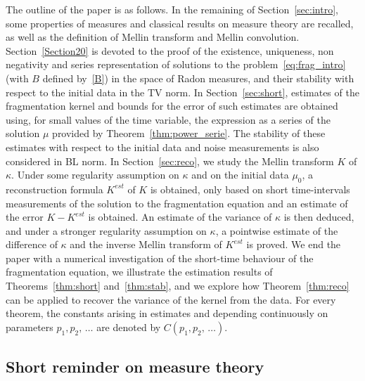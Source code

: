 \documentclass[AHL,Unicode,longabstracts,published]{cedram}
\begin{document}
The outline of the paper is as follows.
In the remaining of Section~\ref{sec:intro}, some properties of measures and classical results on measure theory are recalled, as well as the definition of Mellin transform and Mellin convolution. Section~\ref{Section20} is devoted to the proof of the existence, uniqueness, non negativity and series representation of solutions to the problem~\eqref{eq:frag_intro} (with $B$ defined by~\eqref{B}) in the space of Radon measures, and their stability with respect to the initial data in the TV norm. In Section~\ref{sec:short}, estimates of the fragmentation kernel and bounds for the error of such estimates are obtained using, for small values of the time variable, the expression as a series of the solution $\mu$ provided by Theorem~\ref{thm:power_serie}. The stability of these estimates with respect to the initial data and noise measurements is also considered in BL norm. In Section~\ref{sec:reco}, we study the Mellin transform $K$ of $\kappa $. Under some regularity assumption on $\kappa $ and on the initial data $\mu _0$, a reconstruction formula $K^{est}$ of $K$ is obtained, only based on short time-intervals measurements of the solution to the fragmentation equation and an estimate of the error $K-K^{est}$ is obtained. An estimate of the variance of $\kappa $ is then deduced, and under a stronger regularity assumption on $\kappa $, a pointwise estimate of the difference of $\kappa$ and the inverse Mellin transform of $K^{est}$ is proved. We end the paper with a numerical investigation of the short-time behaviour of the fragmentation equation, we illustrate the estimation results of Theorems~\ref{thm:short} and~\ref{thm:stab}, and we explore how Theorem~\ref{thm:reco} can be applied to recover the variance of the kernel from the data.
For every theorem, the constants arising in estimates and depending continuously on parameters $p_1,p_2,\, \dots$ are denoted by $C(p_1,p_2,\,\dots)$.


\subsection{Short reminder on measure theory}
\end{document}
